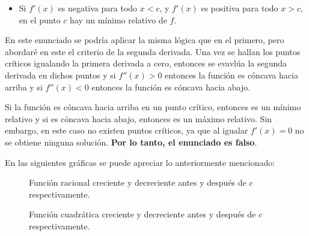\begin{itemize}
    \item Si \(f'(x)\) es negativa para todo \(x<c\), y \(f'(x)\) es positiva para todo \(x>c\), en el punto \(c\) hay un mínimo relativo de \(f\).
\end{itemize}

En este enunciado se podría aplicar la misma lógica que en el primero, pero abordaré en este el criterio de la segunda derivada. Una vez se hallan los puntos críticos igualando la primera derivada a cero, entonces se evavlúa la segunda derivada en dichos puntos y si $f''(x) > 0$ entonces la función es cóncava hacia arriba y si $f''(x) < 0$ entonces la función es cóncava hacia abajo.

Si la función es cóncava hacia arriba en un punto crítico, entonces es un mínimo relativo y si es cóncava hacia abajo, entonces es un máximo relativo. Sin embargo, en este caso no existen puntos críticos, ya que al igualar $f'(x) = 0$ no se obtiene ninguna solución. \textbf{Por lo tanto, el enunciado es falso}.

En las siguientes gráficas se puede apreciar lo anteriormente mencionado:

\begin{figure}[H]
    \centering
    
    \caption{Función racional creciente y decreciente antes y después de $c$ respectivamente.}
    \label{fig:racional2}
\end{figure}

\begin{figure}[H]
    \centering
    
    \caption{Función cuadrática creciente y decreciente antes y después de $c$ respectivamente.}
    \label{fig:cuadratica2}
\end{figure}